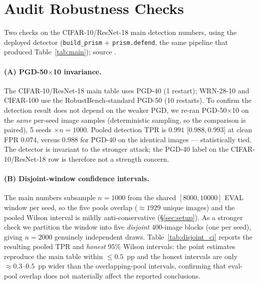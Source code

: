 
\section{Audit Robustness Checks}
\label{app:audit}

Two checks on the CIFAR-10/ResNet-18 main detection numbers, using the
deployed detector (\texttt{build\_prism} $+$ \texttt{prism.defend}, the same
pipeline that produced Table~\ref{tab:main}); source
.

\paragraph{(A) PGD-50$\times$10 invariance.}
The CIFAR-10/ResNet-18 main table uses PGD-40 (1 restart); WRN-28-10 and
CIFAR-100 use the RobustBench-standard PGD-50 (10 restarts). To confirm the
detection result does not depend on the weaker PGD, we re-ran PGD-50$\times$10
on the \emph{same} per-seed image samples (deterministic sampling, so the
comparison is paired), 5 seeds $\times n{=}1000$. Pooled detection TPR is
$0.991$ [$0.988, 0.993$] at clean FPR $0.074$, versus $0.988$ for PGD-40 on the
identical images --- statistically tied. The detector is invariant to the
stronger attack; the PGD-40 label on the CIFAR-10/ResNet-18 row is therefore
not a strength concern.

\paragraph{(B) Disjoint-window confidence intervals.}
The main numbers subsample $n{=}1000$ from the shared $[8000,10000]$ EVAL
window per seed, so the five pools overlap ($\approx 1929$ unique images) and
the pooled Wilson interval is mildly anti-conservative
(\S\ref{sec:setup}). As a stronger check we partition the window into five
\emph{disjoint} $400$-image blocks (one per seed), giving $n{=}2000$ genuinely
independent draws. Table~\ref{tab:disjoint_ci} reports the resulting pooled TPR
and \emph{honest} $95\%$ Wilson intervals: the point estimates reproduce the
main table within $\le 0.5$~pp and the honest intervals are only $\approx
0.3$--$0.5$~pp wider than the overlapping-pool intervals, confirming that
eval-pool overlap does not materially affect the reported conclusions.

